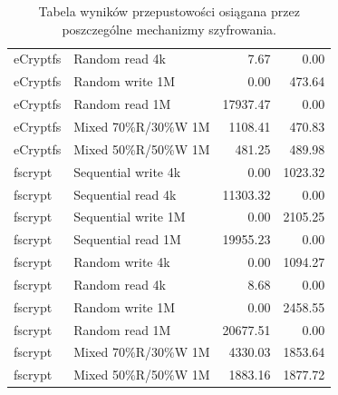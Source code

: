 \documentclass[a4paper]{article}
\begin{document}
\begin{table}[H]
\begin{tabular}{|l|l|r|r|}
        eCryptfs & Random read 4k  & 7.67 & 0.00 \\
        eCryptfs & Random write 1M  & 0.00 & 473.64 \\
        eCryptfs & Random read 1M  & 17937.47 & 0.00 \\
        eCryptfs & Mixed 70\%R/30\%W 1M  & 1108.41 & 470.83 \\
        eCryptfs & Mixed 50\%R/50\%W 1M  & 481.25 & 489.98 \\
        fscrypt & Sequential write 4k & 0.00 & 1023.32 \\
        fscrypt & Sequential read 4k & 11303.32 & 0.00 \\
        fscrypt & Sequential write 1M & 0.00 & 2105.25 \\
        fscrypt & Sequential read 1M & 19955.23 & 0.00 \\
        fscrypt & Random write 4k & 0.00 & 1094.27 \\
        fscrypt & Random read 4k & 8.68 & 0.00 \\
        fscrypt & Random write 1M & 0.00 & 2458.55 \\
        fscrypt & Random read 1M & 20677.51 & 0.00 \\
        fscrypt & Mixed 70\%R/30\%W 1M & 4330.03 & 1853.64 \\
        fscrypt & Mixed 50\%R/50\%W 1M & 1883.16 & 1877.72 \\
        \hline
    \end{tabular}
    \caption{Tabela wyników przepustowości osiągana przez poszczególne mechanizmy szyfrowania.}
    \label{tab:fio_bw}
\end{table}
\end{document}
